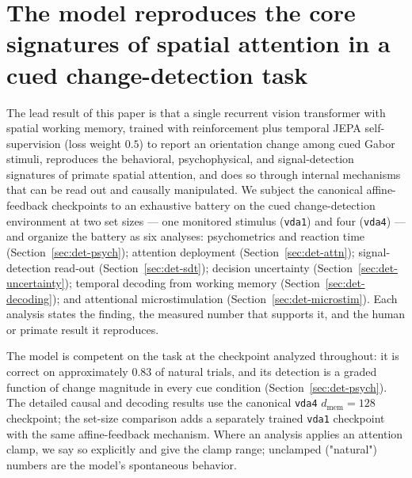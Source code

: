 \section{The model reproduces the core signatures of spatial attention in a
         cued change-detection task}
\label{sec:detection}

The lead result of this paper is that a single recurrent vision transformer with
spatial working memory, trained with reinforcement plus temporal JEPA self-supervision
(loss weight $0.5$) to report an orientation change
among cued Gabor stimuli, reproduces the behavioral, psychophysical, and
signal-detection signatures of primate spatial attention, and does so through
internal mechanisms that can be read out and causally manipulated. We subject the
canonical affine-feedback checkpoints to an exhaustive battery on the cued
change-detection environment at two set sizes --- one monitored stimulus
(\texttt{vda1}) and four (\texttt{vda4}) --- and organize the battery as six analyses: psychometrics and
reaction time (Section~\ref{sec:det-psych}); attention deployment
(Section~\ref{sec:det-attn}); signal-detection read-out
(Section~\ref{sec:det-sdt}); decision uncertainty
(Section~\ref{sec:det-uncertainty}); temporal decoding from working memory
(Section~\ref{sec:det-decoding}); and attentional microstimulation
(Section~\ref{sec:det-microstim}). Each analysis states the finding, the measured
number that supports it, and the human or primate result it reproduces.

The model is competent on the task at the checkpoint analyzed throughout: it is
correct on approximately $0.83$ of natural trials, and its detection is a graded
function of change magnitude in every cue condition (Section~\ref{sec:det-psych}).
The detailed causal and decoding results use the canonical \texttt{vda4}
$d_{\mathrm{mem}}=128$ checkpoint; the set-size comparison adds a separately trained
\texttt{vda1} checkpoint with the same affine-feedback mechanism. Where an analysis
applies an attention clamp, we say so explicitly and
give the clamp range; unclamped ("natural") numbers are the model's spontaneous
behavior.

